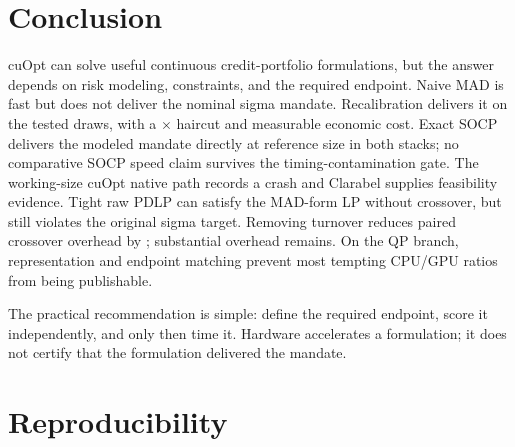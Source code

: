 \documentclass[11pt,a4paper]{article}
\begin{document}
\section{Conclusion}

cuOpt can solve useful continuous credit-portfolio formulations, but the answer
depends on risk modeling, constraints, and the required endpoint.
Naive MAD is fast but does not deliver the nominal sigma mandate.
Recalibration delivers it on the tested draws, with a
\PZeroSelectedMadHaircut$\times$ haircut and measurable economic cost. Exact
SOCP delivers the modeled mandate directly at reference size in both stacks;
no comparative SOCP speed claim survives the timing-contamination gate.
The working-size cuOpt native path records a crash and Clarabel supplies
feasibility evidence. Tight raw PDLP can satisfy the MAD-form LP without
crossover, but still violates the original sigma target. Removing turnover
reduces paired crossover overhead by \PZeroTurnoverMarginalSharePct;
substantial overhead remains.
On the QP branch, representation and endpoint matching prevent most tempting
CPU/GPU ratios from being publishable.

The practical recommendation is simple: define the required endpoint, score it
independently, and only then time it. Hardware accelerates a formulation; it
does not certify that the formulation delivered the mandate.

\section{Reproducibility}
\end{document}
